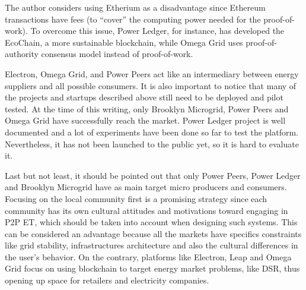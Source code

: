The author considers using Etherium as a disadvantage since Ethereum transactions have fees (to “cover” the computing power needed for the proof-of-work). To overcome this issue, Power Ledger, for instance, has developed the EcoChain, a more sustainable blockchain, while Omega Grid uses proof-of-authority consensus model instead of proof-of-work.



Electron, Omega Grid, and Power Peers act like an intermediary between energy suppliers and all possible consumers. It is also important to notice that many of the projects and startups described above still need to be deployed and pilot tested. At the time of this writing, only Brooklyn Microgrid, Power Peers and Omega Grid have successfully reach the market. Power Ledger project is well documented and a lot of experiments have been done so far to test the platform. Nevertheless, it has not been launched to the public yet, so it is hard to evaluate it.



Last but not least, it should be pointed out that only Power Peers, Power Ledger and Brooklyn Microgrid have as main target micro producers and consumers. Focusing on the local community first is a promising strategy since each community has its own cultural attitudes and motivations toward engaging in \ac{P2P} \ac{ET}, which should be taken into account when designing such systems. This can be considered an advantage because all the markets have specifics constraints like grid stability, infrastructures architecture and also the cultural differences in the user’s behavior. On the contrary, platforms like Electron, Leap and Omega Grid focus on using blockchain to target energy market problems, like \ac{DSR}, thus opening up space for retailers and electricity companies.   

